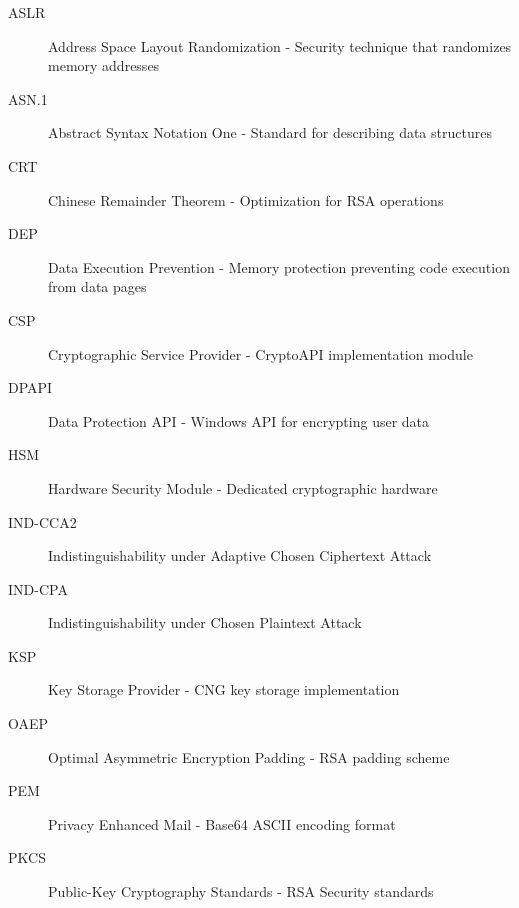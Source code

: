 \begin{description}
    \item[ASLR] Address Space Layout Randomization - Security technique that randomizes memory addresses
    \item[ASN.1] Abstract Syntax Notation One - Standard for describing data structures
    \item[CRT] Chinese Remainder Theorem - Optimization for RSA operations
    \item[DEP] Data Execution Prevention - Memory protection preventing code execution from data pages
    \item[CSP] Cryptographic Service Provider - CryptoAPI implementation module
    \item[DPAPI] Data Protection API - Windows API for encrypting user data
    \item[HSM] Hardware Security Module - Dedicated cryptographic hardware
    \item[IND-CCA2] Indistinguishability under Adaptive Chosen Ciphertext Attack
    \item[IND-CPA] Indistinguishability under Chosen Plaintext Attack
    \item[KSP] Key Storage Provider - CNG key storage implementation
    \item[OAEP] Optimal Asymmetric Encryption Padding - RSA padding scheme
    \item[PEM] Privacy Enhanced Mail - Base64 ASCII encoding format
    \item[PKCS] Public-Key Cryptography Standards - RSA Security standards
\end{description}
